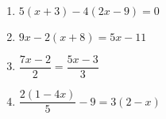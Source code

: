 \documentclass[12pt,letterpaper]{article}
\begin{document}
\begin{large}
\begin{enumerate}
\item \quad $5(x + 3) - 4(2x - 9) = 0$

\addvspace{0.6in}

\item \quad $9x - 2(x + 8) = 5x - 11$

\addvspace{0.6in}

\item \quad $\dfrac{7x - 2}{2} = \dfrac{5x - 3}{3}$

\addvspace{0.6in}

\item \quad $\dfrac{2(1 - 4x)}{5} - 9 = 3(2 - x)$

\addvspace{0.6in}

\end{enumerate}
\end{large}
\end{document}
